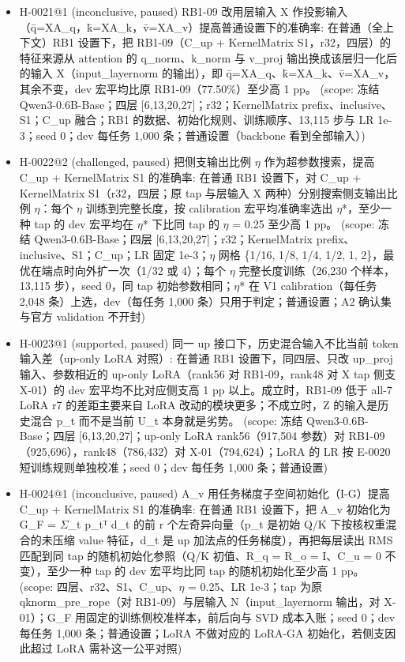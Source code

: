 \documentclass[11pt]{article}
\begin{document}
\begin{itemize}
\item H-0021@1 (inconclusive, paused) RB1-09 改用层输入 X 作投影输入（q̄=XA\_q，k̄=XA\_k，v̄=XA\_v）提高普通设置下的准确率: 在普通（全上下文）RB1 设置下，把 RB1-09（C\_up + KernelMatrix S1，r32，四层）的特征来源从 attention 的 q\_norm、k\_norm 与 v\_proj 输出换成该层归一化后的输入 X（input\_layernorm 的输出），即 q̄=XA\_q、k̄=XA\_k、v̄=XA\_v，其余不变，dev 宏平均比原 RB1-09（77.50\%）至少高 1 pp。 (scope: 冻结 Qwen3-0.6B-Base；四层 [6,13,20,27]；r32；KernelMatrix prefix、inclusive、S1；C\_up 融合；RB1 的数据、初始化规则、训练顺序、13,115 步与 LR 1e-3；seed 0；dev 每任务 1,000 条；普通设置（backbone 看到全部输入）)
\item H-0022@2 (challenged, paused) 把侧支输出比例 \ensuremath{\eta} 作为超参数搜索，提高 C\_up + KernelMatrix S1 的准确率: 在普通 RB1 设置下，对 C\_up + KernelMatrix S1（r32，四层；原 tap 与层输入 X 两种）分别搜索侧支输出比例 \ensuremath{\eta}：每个 \ensuremath{\eta} 训练到完整长度，按 calibration 宏平均准确率选出 \ensuremath{\eta}*，至少一种 tap 的 dev 宏平均在 \ensuremath{\eta}* 下比同 tap 的 \ensuremath{\eta} = 0.25 至少高 1 pp。 (scope: 冻结 Qwen3-0.6B-Base；四层 [6,13,20,27]；r32；KernelMatrix prefix、inclusive、S1；C\_up；LR 固定 1e-3；\ensuremath{\eta} 网格 \{1/16, 1/8, 1/4, 1/2, 1, 2\}，最优在端点时向外扩一次（1/32 或 4）；每个 \ensuremath{\eta} 完整长度训练（26,230 个样本，13,115 步），seed 0，同 tap 初始参数相同；\ensuremath{\eta}* 在 V1 calibration（每任务 2,048 条）上选，dev（每任务 1,000 条）只用于判定；普通设置；A2 确认集与官方 validation 不开封)
\item H-0023@1 (supported, paused) 同一 up 接口下，历史混合输入不比当前 token 输入差（up-only LoRA 对照）: 在普通 RB1 设置下，同四层、只改 up\_proj 输入、参数相近的 up-only LoRA（rank56 对 RB1-09，rank48 对 X tap 侧支 X-01）的 dev 宏平均不比对应侧支高 1 pp 以上。成立时，RB1-09 低于 all-7 LoRA r7 的差距主要来自 LoRA 改动的模块更多；不成立时，Z 的输入是历史混合 p\_t 而不是当前 U\_t 本身就是劣势。 (scope: 冻结 Qwen3-0.6B-Base；四层 [6,13,20,27]；up-only LoRA rank56（917,504 参数）对 RB1-09（925,696），rank48（786,432）对 X-01（794,624）；LoRA 的 LR 按 E-0020 短训练规则单独校准；seed 0；dev 每任务 1,000 条；普通设置)
\item H-0024@1 (inconclusive, paused) A\_v 用任务梯度子空间初始化（I-G）提高 C\_up + KernelMatrix S1 的准确率: 在普通 RB1 设置下，把 A\_v 初始化为 G\_F = \ensuremath{\Sigma}\_t p\_tᵀ d\_t 的前 r 个左奇异向量（p\_t 是初始 Q/K 下按核权重混合的未压缩 value 特征，d\_t 是 up 加法点的任务梯度），再把每层读出 RMS 匹配到同 tap 的随机初始化参照（Q/K 初值、R\_q = R\_o = I、C\_u = 0 不变），至少一种 tap 的 dev 宏平均比同 tap 的随机初始化至少高 1 pp。 (scope: 四层、r32、S1、C\_up、\ensuremath{\eta} = 0.25、LR 1e-3；tap 为原 qknorm\_pre\_rope（对 RB1-09）与层输入 N（input\_layernorm 输出，对 X-01）；G\_F 用固定的训练侧校准样本，前后向与 SVD 成本入账；seed 0；dev 每任务 1,000 条；普通设置；LoRA 不做对应的 LoRA-GA 初始化，若侧支因此超过 LoRA 需补这一公平对照)

\end{itemize}
\end{document}
